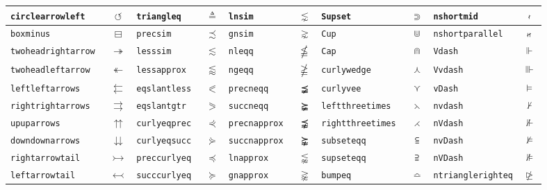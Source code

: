 \documentclass[10pt]{article}
\def\bs{\tt\char92}
\begin{document}
{\begin{tabular}{|l|c||l|c||l|c||l|c||l|c|}
     \bs circlearrowleft    &$\circlearrowleft    $ & \bs triangleq        &$\triangleq        $& \bs lnsim            &$\lnsim            $ &\bs Supset            &$\Supset            $& \bs nshortmid       &$\nshortmid       $\\   \hline
     \bs boxminus           &$\boxminus           $ & \bs precsim          &$\precsim          $& \bs gnsim            &$\gnsim            $ &\bs Cup               &$\Cup               $& \bs nshortparallel  &$\nshortparallel  $\\   \hline
     \bs twoheadrightarrow  &$\twoheadrightarrow  $ & \bs lesssim          &$\lesssim          $& \bs nleqq            &$\nleqq            $ &\bs Cap               &$\Cap               $& \bs Vdash           &$\Vdash           $\\   \hline
     \bs twoheadleftarrow   &$\twoheadleftarrow   $ & \bs lessapprox       &$\lessapprox       $& \bs ngeqq            &$\ngeqq            $ &\bs curlywedge        &$\curlywedge        $& \bs Vvdash          &$\Vvdash          $\\   \hline
     \bs leftleftarrows     &$\leftleftarrows     $ & \bs eqslantless      &$\eqslantless      $& \bs precneqq         &$\precneqq         $ &\bs curlyvee          &$\curlyvee          $& \bs vDash           &$\vDash           $\\   \hline
     \bs rightrightarrows   &$\rightrightarrows   $ & \bs eqslantgtr       &$\eqslantgtr       $& \bs succneqq         &$\succneqq         $ &\bs leftthreetimes    &$\leftthreetimes    $& \bs nvdash          &$\nvdash          $\\   \hline
     \bs upuparrows         &$\upuparrows         $ & \bs curlyeqprec      &$\curlyeqprec      $& \bs precnapprox      &$\precnapprox      $ &\bs rightthreetimes   &$\rightthreetimes   $& \bs nVdash          &$\nVdash          $\\   \hline
     \bs downdownarrows     &$\downdownarrows     $ & \bs curlyeqsucc      &$\curlyeqsucc      $& \bs succnapprox      &$\succnapprox      $ &\bs subseteqq         &$\subseteqq         $& \bs nvDash          &$\nvDash          $\\   \hline
     \bs rightarrowtail     &$\rightarrowtail     $ & \bs preccurlyeq      &$\preccurlyeq      $& \bs lnapprox         &$\lnapprox         $ &\bs supseteqq         &$\supseteqq         $& \bs nVDash          &$\nVDash          $\\   \hline
     \bs leftarrowtail      &$\leftarrowtail      $ & \bs succcurlyeq      &$\succcurlyeq      $& \bs gnapprox         &$\gnapprox         $ &\bs bumpeq            &$\bumpeq            $& \bs ntrianglerighteq&$\ntrianglerighteq$\\   \hline

\end{tabular}}
\end{document}
